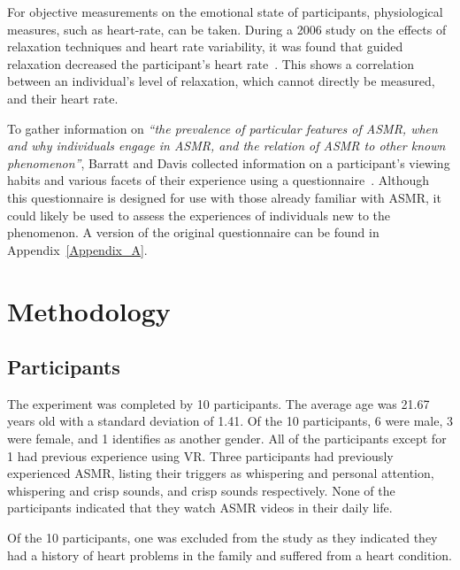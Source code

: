 \documentclass{sigchi}
\newcommand{\inlinequote}[1]{\textit{``#1''}}
\begin{document}
For objective measurements on the emotional state of participants, physiological measures, such as heart-rate, can be taken. During a 2006 study on the effects of relaxation techniques and heart rate variability, it was found that guided relaxation decreased the participant's heart rate~\cite{sarang2006effects}. This shows a correlation between an individual's level of relaxation, which cannot directly be measured, and their heart rate.

To gather information on \inlinequote{the prevalence of particular features of ASMR, when and why individuals engage in ASMR, and the relation of ASMR to other known phenomenon}, Barratt and Davis collected information on a participant's viewing habits and various facets of their experience using a questionnaire~\cite{barratt2015autonomous}. Although this questionnaire is designed for use with those already familiar with ASMR, it could likely be used to assess the experiences of individuals new to the phenomenon. A version of the original questionnaire can be found in Appendix~\ref{Appendix_A}. 



\section{Methodology}

\subsection{Participants}
The experiment was completed by 10 participants. The average age was 21.67 years old with a standard deviation of 1.41. Of the 10 participants, 6 were male, 3 were female, and 1 identifies as another gender. All of the participants except for 1 had previous experience using VR. Three participants had previously experienced ASMR, listing their triggers as whispering and personal attention, whispering and crisp sounds, and crisp sounds respectively. None of the participants indicated that they watch ASMR videos in their daily life.

Of the 10 participants, one was excluded from the study as they indicated they had a history of heart problems in the family and suffered from a heart condition.
\end{document}
